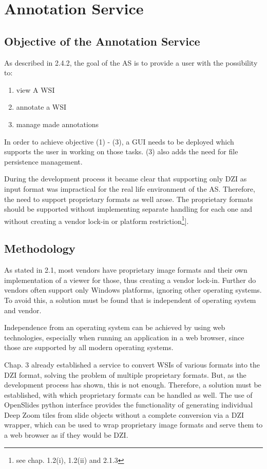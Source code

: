 \chapter{Annotation Service}

\section{Objective of the Annotation Service}
As described in 2.4.2, the goal of the AS is to provide a user with the possibility to:
\begin{enumerate}[(1)]
	\item view A WSI
	\item annotate a WSI
	\item manage made annotations
\end{enumerate}

In order to achieve objective (1) - (3), a GUI needs to be deployed which supports the user in working on those tasks. (3) also adds the need for file persistence management.

During the development process it became clear that supporting only DZI as input format was impractical for the real life environment of the AS. Therefore, the need to support proprietary formats as well arose. The proprietary formats should be supported without implementing separate handling for each one and without creating a vendor lock-in or platform restriction\footnote{see chap. 1.2(i), 1.2(ii) and 2.1.3}].


\section{Methodology}
As stated in 2.1, most vendors have proprietary image formats and their own implementation of a viewer for those, thus creating a vendor lock-in. Further do vendors often support only Windows platforms, ignoring other operating systems\cite{Cornish13}\cite{DICOM10}\cite{Farahanil15}. To avoid this, a solution must be found that is independent of operating system and vendor.

Independence from an operating system can be achieved by using web technologies, especially when running an application in a web browser\cite{Tseytlin14}, since those are supported by all modern operating systems. 

Chap. 3 already established a service to convert WSIs of various formats into the DZI format, solving the problem of multiple proprietary formats. But, as the development process has shown, this is not enough. Therefore, a solution must be established, with which proprietary formats can be handled as well. The use of OpenSlides python interface provides the functionality of generating individual Deep Zoom tiles from slide objects without a complete conversion via a DZI wrapper, which can be used to wrap proprietary image formats and serve them to a web browser as if they would be DZI\cite{web:openslide}.

